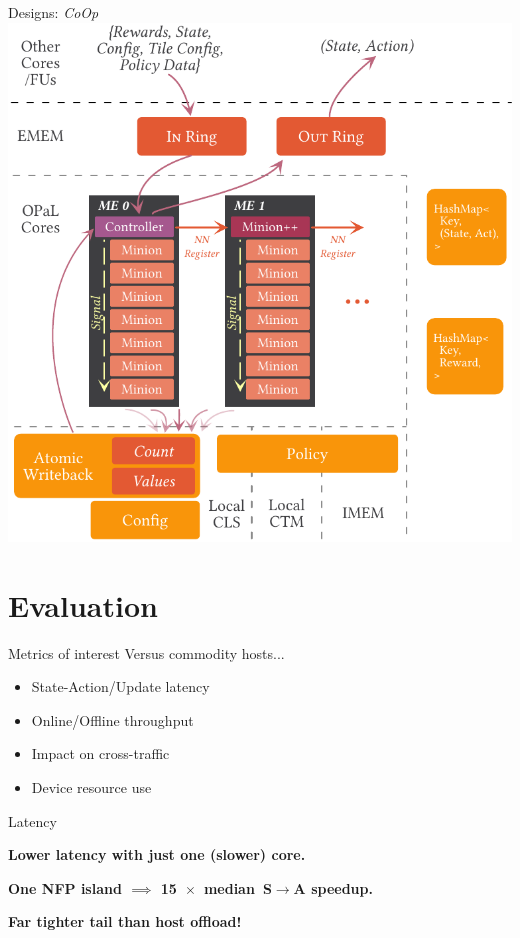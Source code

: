 \documentclass[aspectratio=169,xcolor={dvipsnames}
]{beamer}
\begin{document}
\begin{frame}{Designs: \emph{CoOp}}
	\centering
	\includegraphics[width=0.535\linewidth]{../paper/figures/coop}
\end{frame}

\section{Evaluation}

\begin{frame}{Metrics of interest}
	Versus commodity hosts...
	\begin{itemize}[<+->]
		\item State-Action/Update latency
		\item Online/Offline throughput
		\item Impact on cross-traffic
		\item Device resource use
	\end{itemize}
\end{frame}

\begin{frame}{Latency}
	\centering
	\pause
	
	\textbf{Lower latency with \alert{just one (slower) core}.}\pause
	
	\textbf{One NFP island $\implies$ \alert{\SI{15}{$\times$} median S$\rightarrow$A speedup}.}\pause
	
	\textbf{Far tighter tail than host offload!}
\end{frame}
\end{document}
